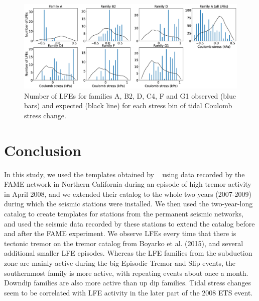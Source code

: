 \documentclass[draft]{agujournal2019}
\begin{document}
\begin{figure}
\noindent\includegraphics[width=\textwidth, trim={0cm 0cm 0cm 0cm},clip]{figures/coulomb.eps}
\caption{Number of LFEs for families A, B2, D, C4, F and G1 observed (blue bars) and expected (black line) for each stress bin of tidal Coulomb stress change.}
\label{pngfiguresample}
\end{figure}

\section{Conclusion}

In this study, we used the templates obtained by ~ using data recorded by the FAME network in Northern California during an episode of high tremor activity in April 2008, and we extended their catalog to the whole two years (2007-2009) during which the seismic stations were installed. We then used the two-year-long catalog to create templates for stations from the permanent seismic networks, and used the seismic data recorded by these stations to extend the catalog before and after the FAME experiment. We observe LFEs every time that there is tectonic tremor on the tremor catalog from Boyarko et al. (2015), and several additional smaller LFE episodes. Whereas the LFE families from the subduction zone are mainly active during the big Episodic Tremor and Slip events, the southernmost family is more active, with repeating events about once a month. Downdip families are also more active than up dip families. Tidal stress changes seem to be correlated with LFE activity in the later part of the 2008 ETS event.


\end{document}
